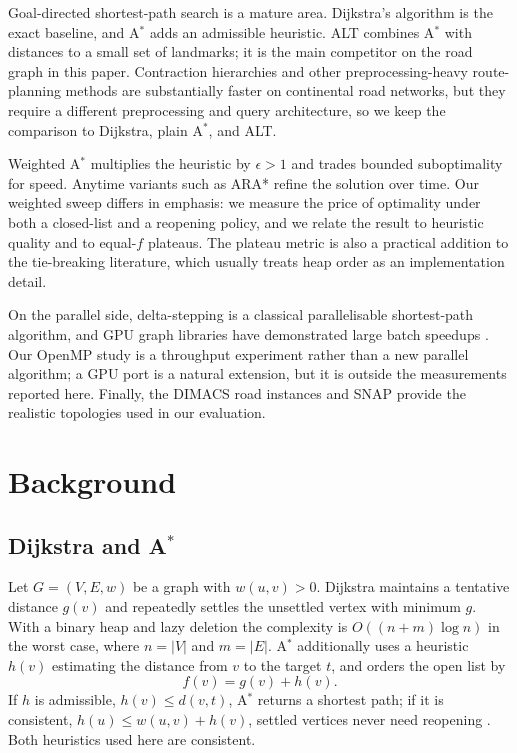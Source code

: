 \documentclass[conference,10pt]{IEEEtran}
\newcommand{\Astar}{A$^\ast$}
\begin{document}
Goal-directed shortest-path search is a mature area.  Dijkstra's algorithm
\cite{dijkstra1959} is the exact baseline, and \Astar{} \cite{hart1968} adds an
admissible heuristic.  ALT \cite{goldberg2005} combines \Astar{} with distances
to a small set of landmarks; it is the main competitor on the road graph in
this paper.  Contraction hierarchies \cite{geisberger2008} and other
preprocessing-heavy route-planning methods are substantially faster on
continental road networks, but they require a different preprocessing and query
architecture, so we keep the comparison to Dijkstra, plain \Astar{}, and ALT.

Weighted \Astar{} \cite{pohl1970} multiplies the heuristic by
\(\epsilon>1\) and trades bounded suboptimality for speed.  Anytime variants
such as ARA* \cite{likhachev2003} refine the solution over time.  Our weighted
sweep differs in emphasis: we measure the price of optimality under both a
closed-list and a reopening policy, and we relate the result to heuristic
quality and to equal-\(f\) plateaus.  The plateau metric is also a practical
addition to the tie-breaking literature, which usually treats heap order as an
implementation detail.

On the parallel side, delta-stepping \cite{meyer2003} is a classical
parallelisable shortest-path algorithm, and GPU graph libraries have
demonstrated large batch speedups \cite{harish2007}.  Our OpenMP study is a
throughput experiment rather than a new parallel algorithm; a GPU port is a
natural extension, but it is outside the measurements reported here.  Finally,
the DIMACS road instances \cite{dimacs} and SNAP \cite{snap} provide the
realistic topologies used in our evaluation.

\section{Background}
\label{sec:background}

\subsection{Dijkstra and \Astar{}}
Let $G=(V,E,w)$ be a graph with $w(u,v)>0$.  Dijkstra maintains a tentative
distance $g(v)$ and repeatedly settles the unsettled vertex with minimum $g$.
With a binary heap and lazy deletion the complexity is
$O((n+m)\log n)$ in the worst case, where $n=|V|$ and $m=|E|$.
\Astar{} additionally uses a heuristic $h(v)$ estimating the distance from $v$
to the target $t$, and orders the open list by
\begin{equation}
  f(v)=g(v)+h(v).
\end{equation}
If $h$ is admissible, $h(v)\le d(v,t)$, \Astar{} returns a shortest path; if it
is consistent, $h(u)\le w(u,v)+h(v)$, settled vertices never need reopening
\cite{hart1968,russell2020}.  Both heuristics used here are consistent.
\end{document}
